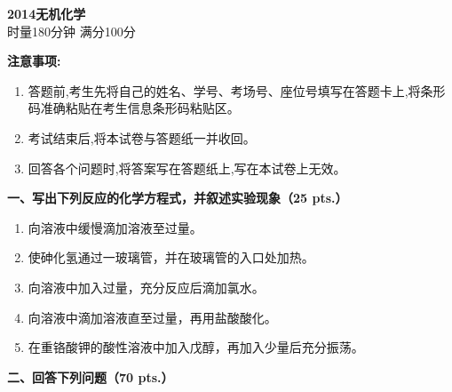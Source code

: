 \begin{center}
    {\LARGE \textbf{2014无机化学}} \\[2ex]
    {\large 时量180分钟 \quad 满分100分}
\end{center}

\vspace{0.5cm}
\noindent\textbf{注意事项:}
\begin{enumerate}[label=\arabic*., parsep=0pt, itemsep=0pt]
    \item 答题前,考生先将自己的姓名、学号、考场号、座位号填写在答题卡上,将条形码准确粘贴在考生信息条形码粘贴区。
    \item 考试结束后,将本试卷与答题纸一并收回。
    \item 回答各个问题时,将答案写在答题纸上,写在本试卷上无效。
\end{enumerate}

\vspace{0.5cm}
\noindent\textbf{一、写出下列反应的化学方程式，并叙述实验现象（25 pts.）}

\begin{enumerate}[label=\arabic*., start=1, itemsep=1.5ex]
    \item 向溶液中缓慢滴加溶液至过量。
    \item 使砷化氢通过一玻璃管，并在玻璃管的入口处加热。
    \item 向溶液中加入过量，充分反应后滴加氯水。
    \item 向溶液中滴加溶液直至过量，再用盐酸酸化。
    \item 在重铬酸钾的酸性溶液中加入戊醇，再加入少量后充分振荡。
\end{enumerate}

\vspace{0.5cm}
\noindent\textbf{二、回答下列问题（70 pts.）}

